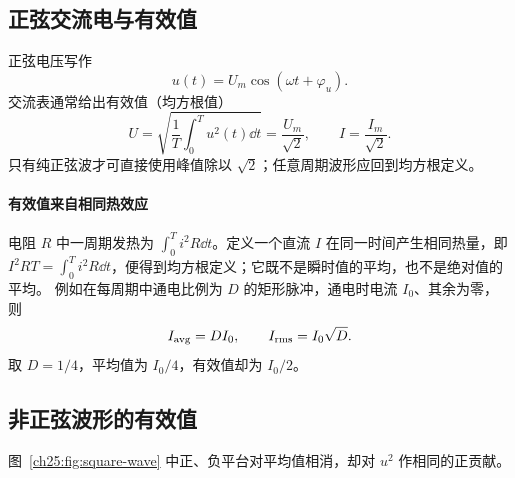 \subsection{正弦交流电与有效值}


正弦电压写作
\begin{equation}
 u(t)=U_m\cos(\omega t+\varphi_u).
\end{equation}
交流表通常给出有效值（均方根值）
\begin{equation}
 U=\sqrt{\frac1T\int_0^T u^2(t)\dd t}=\frac{U_m}{\sqrt2},
 \qquad I=\frac{I_m}{\sqrt2}.
\end{equation}
只有纯正弦波才可直接使用峰值除以 $\sqrt2$；任意周期波形应回到均方根定义。


\paragraph{有效值来自相同热效应}
电阻 $R$ 中一周期发热为 $\int_0^T i^2R\dd t$。定义一个直流 $I$ 在同一时间产生相同热量，即
$I^2RT=\int_0^Ti^2R\dd t$，便得到均方根定义；它既不是瞬时值的平均，也不是绝对值的平均。
例如在每周期中通电比例为 $D$ 的矩形脉冲，通电时电流 $I_0$、其余为零，则
\[
 I_{\rm avg}=DI_0,\qquad I_{\rm rms}=I_0\sqrt D.
\]
取 $D=1/4$，平均值为 $I_0/4$，有效值却为 $I_0/2$。
\subsection{非正弦波形的有效值}


\begin{center}
\end{center}
图~\ref{ch25:fig:square-wave} 中正、负平台对平均值相消，却对 $u^2$ 作相同的正贡献。

